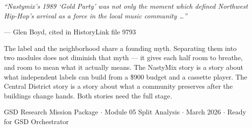 \documentclass[11pt,letterpaper]{article}
\begin{document}
\vspace{2em}
\begin{quotebox}
\textit{``Nastymix's 1989 `Gold Party' was not only the moment which defined Northwest Hip-Hop's
arrival as a force in the local music community \ldots''}

\vspace{0.5em}
{\small\textcolor{subtlegray}{--- Glen Boyd, cited in HistoryLink file 9793}}

\vspace{1em}
The label and the neighborhood share a founding myth. Separating them into two modules
does not diminish that myth --- it gives each half room to breathe, and room to mean
what it actually means. The NastyMix story is a story about what independent labels
can build from a \$900 budget and a cassette player. The Central District story is a
story about what a community preserves after the buildings change hands.
Both stories need the full stage.
\end{quotebox}

\vspace{1em}
\begin{center}
{\small\sffamily\textcolor{subtlegray}{GSD Research Mission Package $\cdot$ Module 05 Split Analysis $\cdot$ March 2026 $\cdot$ Ready for GSD Orchestrator}}
\end{center}
\end{document}
